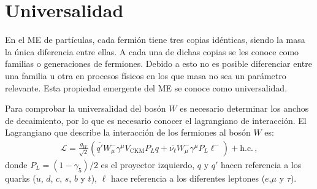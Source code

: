 \section{Universalidad}

En el ME de partículas, cada fermión tiene tres copias idénticas, siendo la masa la única diferencia entre ellas. A cada una de dichas copias se les conoce como familias o generaciones de fermiones. Debido a esto no es posible diferenciar entre una familia u otra en procesos físicos en los que masa no sea un parámetro relevante. Esta propiedad emergente del ME se conoce como universalidad.

Para comprobar la universalidad del bosón $W$ es necesario determinar los anchos de decaimiento, por lo que es necesario conocer el lagrangiano de interacción. El Lagrangiano que describe la interacción de los fermiones al bosón $W$ es:
%
\begin{align}\label{Eq:LagW}
\mathcal{L} = \frac{g_W}{\sqrt{2}} (\overline{q'} {W}_{\mu}^{-}  \gamma ^{\mu} V_{\text{CKM}} P_{L} q + \overline{\nu_{\ell}} {W}_{\mu}^{-} \gamma ^{\mu} P_{L} \ell^{-}) + \text{h.c.}\,,
\end{align}
%
donde $P_{L} = (1 - \gamma_5)/2$ es el proyector izquierdo, $q$ y $q'$ hacen referencia a los quarks ($u$, $d$, $c$, $s$, $b$ y $t$), $\ell$ hace referencia a los diferentes leptones ($e$,$\mu$ y $\tau$).

